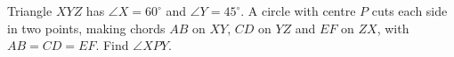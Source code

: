 Triangle $XYZ$ has $\angle X=60^\circ$ and $\angle Y=45^\circ$. A circle with centre $P$ cuts each side in two points, making chords $AB$ on $XY$, $CD$ on $YZ$ and $EF$ on $ZX$, with $AB=CD=EF$. Find $\angle XPY$.
